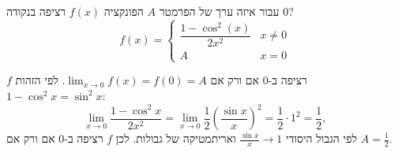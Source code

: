 
\begin{question}
עבור איזה ערך של הפרמטר $A$ הפונקציה $f(x)$ רציפה בנקודה $0$?
\[ f(x)=\begin{cases}\dfrac{1-\cos^2(x)}{2x^2} & x\neq0\\ A & x=0\end{cases} \]
\end{question}

\begin{solution}
$f$ רציפה ב-$0$ אם ורק אם $\lim_{x\to0}f(x)=f(0)=A$. לפי הזהות $1-\cos^2x=\sin^2x$:
\[ \lim_{x\to0}\frac{1-\cos^2x}{2x^2}=\lim_{x\to0}\frac12\left(\frac{\sin x}{x}\right)^2=\frac12\cdot1^2=\frac12, \]
לפי הגבול היסודי $\frac{\sin x}{x}\to1$ ואריתמטיקה של גבולות. לכן $f$ רציפה ב-$0$ אם ורק אם $\boxed{A=\frac12}$.
\end{solution}
